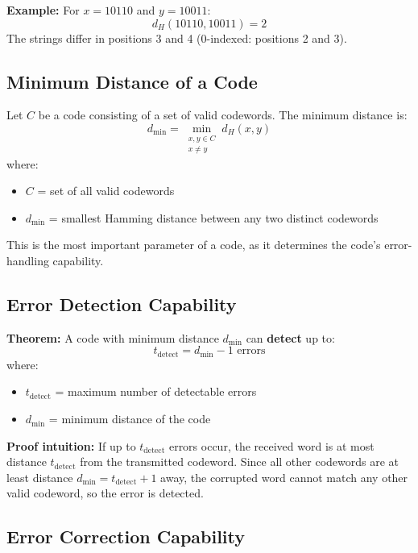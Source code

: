 \textbf{Example:} For $x = 10110$ and $y = 10011$:
\begin{equation}
d_H(10110, 10011) = 2
\end{equation}
The strings differ in positions 3 and 4 (0-indexed: positions 2 and 3).

\subsection{Minimum Distance of a Code}

Let $C$ be a code consisting of a set of valid codewords. The minimum distance is:
\begin{equation}
d_{\min} = \min_{\substack{x,y \in C \\ x \neq y}} d_H(x, y)
\label{eq:min-distance}
\end{equation}
where:
\begin{itemize}
\item $C$ = set of all valid codewords
\item $d_{\min}$ = smallest Hamming distance between any two distinct codewords
\end{itemize}

This is the most important parameter of a code, as it determines the code's error-handling capability.

\subsection{Error Detection Capability}

\textbf{Theorem:} A code with minimum distance $d_{\min}$ can \textbf{detect} up to:
\begin{equation}
t_{\text{detect}} = d_{\min} - 1 \text{ errors}
\label{eq:detect-capability}
\end{equation}
where:
\begin{itemize}
\item $t_{\text{detect}}$ = maximum number of detectable errors
\item $d_{\min}$ = minimum distance of the code
\end{itemize}

\textbf{Proof intuition:} If up to $t_{\text{detect}}$ errors occur, the received word is at most distance $t_{\text{detect}}$ from the transmitted codeword. Since all other codewords are at least distance $d_{\min} = t_{\text{detect}} + 1$ away, the corrupted word cannot match any other valid codeword, so the error is detected.

\subsection{Error Correction Capability}

